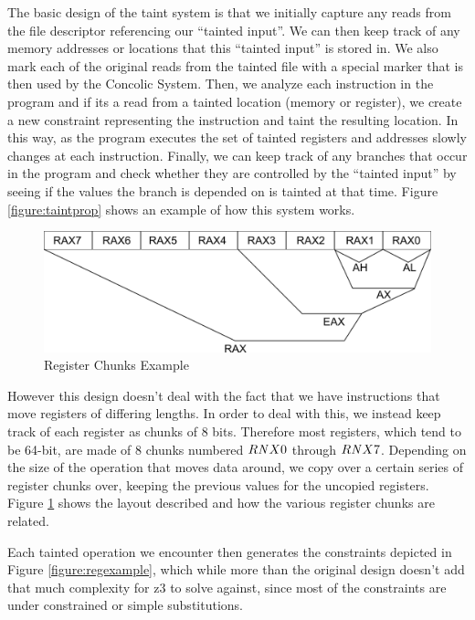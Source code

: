 The basic design of the taint system is that we initially capture any reads from
the file descriptor referencing our ``tainted input''. We can then keep track of
any memory addresses or locations that this ``tainted input'' is stored
in. We also mark each of the original reads from the tainted file with a special
marker that is then used by the Concolic System. Then, we analyze each
instruction in the program and if its a read from a tainted location (memory or
register), we create a new constraint representing the instruction and taint the
resulting location. In this way, as the program executes the set of tainted
registers and addresses slowly changes at each instruction. Finally, we can keep
track of any branches that occur in the program and check whether they are
controlled by the ``tainted input'' by seeing if the values the branch is
depended on is tainted at that time. Figure \ref{figure:taintprop} shows an
example of how this system works.

\begin{figure}[ht]
 \centering
 \includegraphics{taintregs}
 \caption{Register Chunks Example}
 \label{figure:taintregs}
\end{figure}

However this design doesn't deal with the fact that we have instructions that
move registers of differing lengths. In order to deal with this, we instead keep
track of each register as chunks of 8 bits. Therefore most registers, which tend
to be 64-bit, are made of 8 chunks numbered $R{\it N}X0$ through $R{\it  N}X7$.  
Depending on the size of the operation that moves data around, we copy
over a certain series of register chunks over, keeping the previous values for
the uncopied registers. Figure \ref{figure:taintregs} shows the layout described
and how the various register chunks are related.

Each tainted operation we encounter then generates the constraints depicted in
Figure \ref{figure:regexample}, which while more than the original design
doesn't add that much complexity for z3 to solve against, since most of the
constraints are under constrained or simple substitutions.

